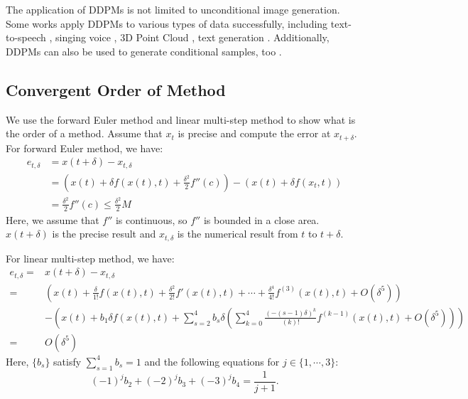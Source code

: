 \documentclass{article}
\begin{document}
The application of DDPMs is not limited to unconditional image generation. Some works apply DDPMs to various types of data successfully, including text-to-speech \citep{chen2020, Lam2021}, singing voice \citep{liu2021diffsinger}, 3D Point Cloud \citep{Luo2021}, text generation \citep{Austin2021}. Additionally, DDPMs can also be used to generate conditional samples, too \citep{Jeong2021, Choi2021}.


\subsection{Convergent Order of Method}
\label{order_method}

We use the forward Euler method and linear multi-step method to show what is the order of a method. Assume that $x_{t}$ is precise and compute the error at $x_{t+\delta}$. For forward Euler method, we have:
\begin{equation}
   \begin{split}
      e_{t,\delta}   &= x(t+\delta) - x_{t,\delta} \\
                     &= \left(x(t) + \delta f(x(t), t) + \frac{\delta^2}{2}f''(c) \right) - (x(t) + \delta f(x_t, t)) \\
                     &= \frac{\delta^2}{2}f''(c) \leq \frac{\delta^2}{2}M
   \end{split}
   \label{error_one}
\end{equation}
Here, we assume that $f''$ is continuous, so $f''$ is bounded in a close area. $x(t+\delta)$ is the precise result and $x_{t,\delta}$ is the numerical result from $t$ to $t+\delta$.

For linear multi-step method, we have:
\begin{equation}
   \begin{split}
      e_{t,\delta}   =& x(t+\delta) - x_{t,\delta} \\
                     =& \left(x(t) + \frac{\delta}{1 !} f(x(t), t)+\frac{\delta^{2}}{2 !}f'(x(t), t)+\cdots+\frac{\delta^{4}}{4 !} f^{(3)}(x(t), t)+O\left(\delta^{5}\right)  \right) \\
                     & - \left(x(t) + b_1 \delta f(x(t), t) +\sum_{s=2}^4 b_{s} \delta \left(\sum_{k=0}^{4}\frac{(-(s-1) \delta)^{k}}{(k) !} f^{(k-1)}(x(t), t)+O\left(\delta^{5}\right)\right)  \right) \\
                     =& O(\delta^5)
   \end{split}
   \label{error_four}
\end{equation} 
Here, $\{b_s\}$ satisfy $\sum_{s=1}^4 b_s =1$ and the following equations for $j \in \{1, \cdots, 3\}$:
\begin{equation}
   (-1)^{j} b_{2}+(-2)^{j} b_{3}+(-3)^{j} b_{4}=\frac{1}{j+1}.
\end{equation}
\end{document}
